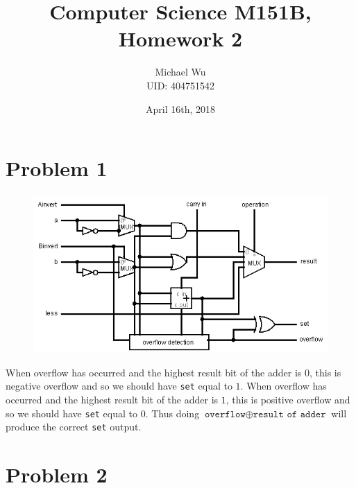 \documentclass[12pt]{article}
\begin{document}
\title{Computer Science M151B, Homework 2}
\date{April 16th, 2018}
\author{Michael Wu\\UID: 404751542}
\maketitle

\section*{Problem 1}

\begin{figure}[ht]
    \begin{center}
        \includegraphics[width=\textwidth]{problem1.png}
    \end{center}
\end{figure}
When overflow has occurred and the highest result bit of the adder is \(0\), this is negative overflow and so we should have \texttt{set}
equal to \(1\). When overflow has occurred and the highest result bit of the adder is \(1\), this is positive overflow and so
we should have \texttt{set} equal to \(0\). Thus doing \(\texttt{overflow} \oplus \texttt{result of adder}\) will produce the correct
\texttt{set} output.

\section*{Problem 2}
\end{document}
